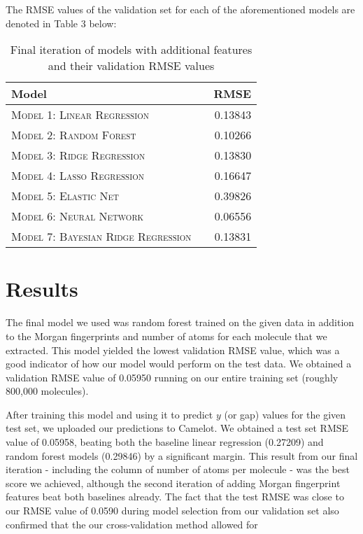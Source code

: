 \documentclass[11pt]{article}
\begin{document}
The RMSE values of the validation set for each of the aforementioned models are denoted in Table 3 below:
    \begin{table}[h!]
    \centering
    \begin{tabular}{llr}
     \toprule
     Model &  & RMSE \\
     \midrule
     \textsc{Model 1: Linear Regression} & & 0.13843 \\
     \textsc{Model 2: Random Forest} & & 0.10266\\
     \textsc{Model 3: Ridge Regression} & & 0.13830 \\
     \textsc{Model 4: Lasso Regression} & & 0.16647 \\
     \textsc{Model 5: Elastic Net} & & 0.39826 \\
     \textsc{Model 6: Neural Network} & & 0.06556 \\
     \textsc{Model 7: Bayesian Ridge Regression} & & 0.13831 \\
     \bottomrule
    \end{tabular}
    \caption{\label{tab:results} Final iteration of models with additional features and their validation RMSE values}
    \end{table}


\section{Results}

The final model we used was random forest trained on the given data in addition to the Morgan fingerprints and number of atoms for each molecule that we extracted. This model yielded the lowest validation RMSE value, which was a good indicator of how our model would perform on the test data. We obtained a validation RMSE value of 0.05950 running on our entire training set (roughly 800,000 molecules).

After training this model and using it to predict $y$ (or gap) values for the given test set, we uploaded our predictions to Camelot. We obtained a test set RMSE value of 0.05958, beating both the baseline linear regression (0.27209) and random forest models (0.29846) by a significant margin. This result from our final iteration - including the column of number of atoms per molecule - was the best score we achieved, although the second iteration of adding Morgan fingerprint features beat both baselines already. The fact that the test RMSE was close to our RMSE value of 0.0590 during model selection from our validation set also confirmed that the our cross-validation method allowed for 
\end{document}
